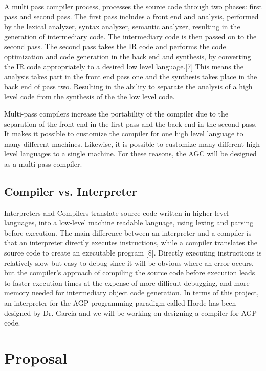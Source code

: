 \documentclass[11pt]{article}
\begin{document}
A multi pass compiler process, processes the source code through two phases: first pass  and second pass. The first pass includes a front end and analysis, performed by the lexical analyzer, syntax analyzer, semantic analyzer, resulting in the generation of intermediary code. The intermediary code is then passed on to the second pass. The second pass takes the IR code and performs the code optimization and code generation in the back end and synthesis, by converting the IR code appropriately to a desired low level language.[7] This means the analysis takes part in the front end pass one and the synthesis takes place in the back end of pass two. Resulting in the ability to separate the analysis of a high level code from the synthesis of the the low level code.

Multi-pass compilers increase the portability of the compiler due to the separation of the front end in the first pass and the back end in the second pass. It makes it possible to customize the compiler for one high level language to many different machines. Likewise, it is possible to customize many different high level languages to a single machine. For these reasons, the AGC will be designed as a multi-pass compiler.


\subsection{Compiler vs. Interpreter}

Interpreters and Compilers translate source code written in higher-level languages, into a low-level machine readable language, using lexing and parsing before execution. The main difference between an interpreter and a compiler is that an interpreter directly executes instructions, while a compiler translates the source code to create an executable program [8]. Directly executing instructions is relatively slow but easy to debug since it will be obvious where an error occurs, but the compiler’s approach of compiling the source code before execution leads to faster execution times at the expense of more difficult debugging, and more memory needed for intermediary object code generation. In terms of this project, an interpreter for the AGP programming paradigm called Horde has been designed by Dr. Garcia and we will be working on designing a compiler for AGP code.


\section{Proposal}
\end{document}
